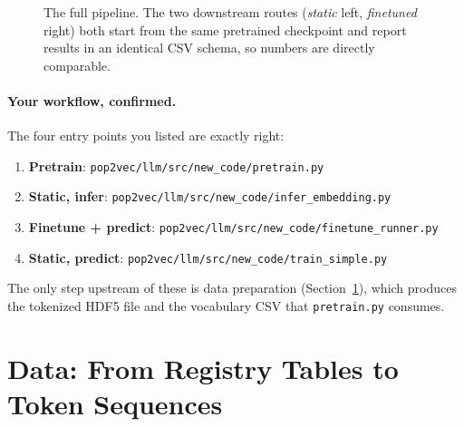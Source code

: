 \documentclass[11pt,a4paper]{article}
\newcommand{\file}[1]{\texttt{\small #1}}
\begin{document}
\begin{figure}[h!]
{}
\caption{The full pipeline. The two downstream routes (\emph{static} left,
\emph{finetuned} right) both start from the same pretrained checkpoint and
report results in an identical CSV schema, so numbers are directly comparable.}
\label{fig:pipeline}
\end{figure}

\paragraph{Your workflow, confirmed.} The four entry points you listed are
exactly right:
\begin{enumerate}[nosep]
  \item \textbf{Pretrain}: \file{pop2vec/llm/src/new\_code/pretrain.py}
  \item[2a.] \textbf{Static, infer}: \file{pop2vec/llm/src/new\_code/infer\_embedding.py}
  \item[2b.] \textbf{Finetune + predict}: \file{pop2vec/llm/src/new\_code/finetune\_runner.py}
  \item[3a.] \textbf{Static, predict}: \file{pop2vec/llm/src/new\_code/train\_simple.py}
\end{enumerate}
The only step upstream of these is data preparation (Section~\ref{sec:data}),
which produces the tokenized HDF5 file and the vocabulary CSV that
\file{pretrain.py} consumes.

\section{Data: From Registry Tables to Token Sequences}\label{sec:data}
\end{document}
